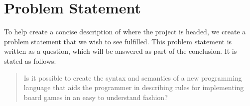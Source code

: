 \section{Problem Statement}
To help create a concise description of where the
project is headed, we create a problem statement
that we wish to see fulfilled. This problem
statement is written as a question, which will be
answered as part of the conclusion. It is stated
as follows:

\begin{quote}
  Is it possible to create the syntax and semantics
  of a new programming language that aids the
  programmer in describing rules for implementing
  board games in an easy to understand fashion?
\end{quote}
